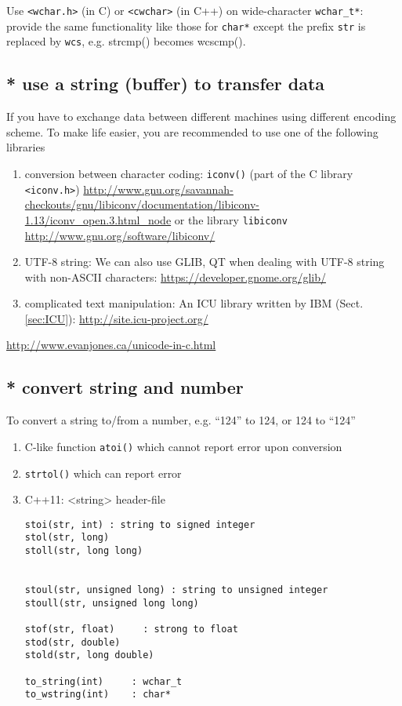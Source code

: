 Use \verb!<wchar.h>! (in C) or \verb!<cwchar>! (in C++) on wide-character
\verb!wchar_t*!: provide the same functionality like those for \verb!char*!  
except the prefix \verb!str! is replaced by \verb!wcs!, e.g. strcmp() becomes
wcscmp().

\subsection{* use a string (buffer) to transfer data}

If you have to exchange data between different machines using different encoding
scheme. To make life easier, you are recommended to use one of the following
libraries
\begin{enumerate}
  
  \item conversion between character coding: \verb!iconv()! (part of the C
  library \verb!<iconv.h>!)
  \url{http://www.gnu.org/savannah-checkouts/gnu/libiconv/documentation/libiconv-1.13/iconv_open.3.html_node}
  or the library \verb!libiconv! \url{http://www.gnu.org/software/libiconv/}
  
  
  \item  UTF-8 string: We can also use GLIB, QT when dealing with UTF-8 string with non-ASCII
characters: \url{https://developer.gnome.org/glib/}
   
   \item complicated text manipulation: An ICU library written by IBM
   (Sect.\ref{sec:ICU}): 
   \url{http://site.icu-project.org/}
   
\end{enumerate}

\url{http://www.evanjones.ca/unicode-in-c.html}

\subsection{* convert string and number}
\label{sec:convert-C-string-to-number}

To convert a string to/from a number, e.g. ``124'' to 124, 
or 124 to ``124''
\begin{enumerate}
  \item C-like function \verb!atoi()! which cannot report error upon conversion
  
  \item \verb!strtol()! which can report error
  
  \item C++11: <string> header-file
\begin{verbatim}
stoi(str, int) : string to signed integer
stol(str, long) 
stoll(str, long long)

 
stoul(str, unsigned long) : string to unsigned integer
stoull(str, unsigned long long)

stof(str, float)     : strong to float
stod(str, double)
stold(str, long double)

to_string(int)     : wchar_t
to_wstring(int)    : char*
\end{verbatim}

\end{enumerate}

